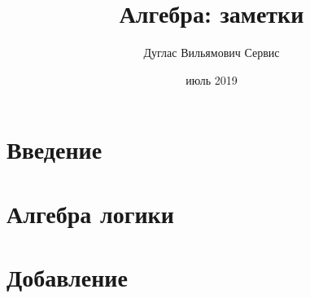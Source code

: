 \documentclass[fleqn,11pt]{article}
\theoremstyle{definition}
\newtheorem{definition}{Определение}
\begin{document}
\title{Алгебра: заметки}
\author{Дуглас Вильямович Сервис}
\date{июль 2019}
\maketitle

\section{Введение}

\section{Алгебра логики}



\printbibliography
\clearpage

\section{Добавление}
\end{document}
